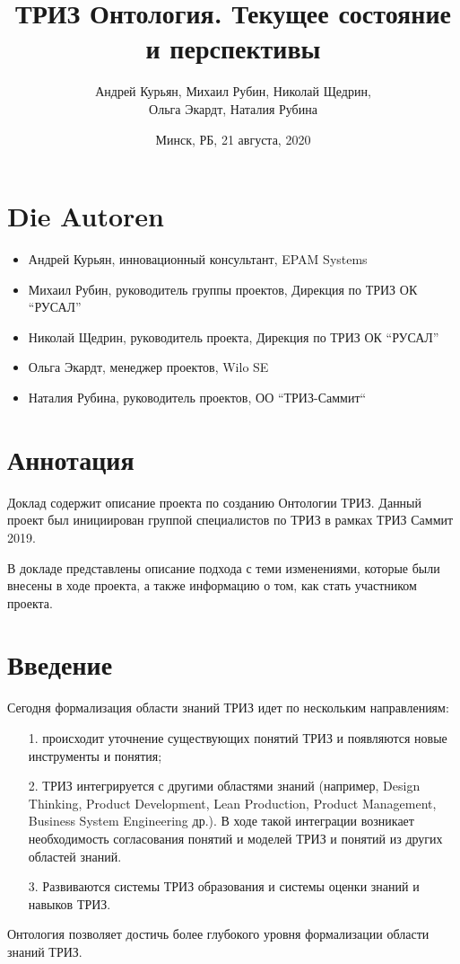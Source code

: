 \documentclass[11pt,a4paper]{article}
\title{ТРИЗ Онтология. Текущее состояние и перспективы}
\author{Андрей Курьян, Михаил Рубин, Николай Щедрин,\\ Ольга Экардт, Наталия
  Рубина}
\date{Минск, РБ, 21 августа, 2020}
\begin{document}
\maketitle

\section{Die Autoren}

\begin{itemize}[noitemsep]
\item Андрей Курьян, инновационный консультант, EPAM Systems
\item Михаил Рубин, руководитель группы проектов, Дирекция по ТРИЗ ОК “РУСАЛ”
\item Николай Щедрин, руководитель проекта, Дирекция по ТРИЗ ОК “РУСАЛ”
\item Ольга Экардт, менеджер проектов, Wilo SE
\item Наталия Рубина, руководитель проектов, ОО “ТРИЗ-Саммит“
\end{itemize}

\section{Аннотация}

Доклад содержит описание проекта по созданию Онтологии ТРИЗ. Данный проект был
инициирован группой специалистов по ТРИЗ в рамках ТРИЗ Саммит 2019.

В докладе представлены описание подхода с теми изменениями, которые были
внесены в ходе проекта, а также информацию о том, как стать участником
проекта.

\section{Введение}

Сегодня формализация области знаний ТРИЗ идет по нескольким направлениям:
\begin{itemize}
\item[1.] происходит уточнение существующих понятий ТРИЗ и появляются новые
  инструменты и понятия;
\item[2.] ТРИЗ интегрируется с другими областями знаний (например, Design
  Thinking, Product Development, Lean Production, Product Management, Business
  System Engi\-neering др.). В ходе такой интеграции возникает необходимость
  согласования понятий и моделей ТРИЗ и понятий из других областей знаний.
\item[3.] Развиваются системы ТРИЗ образования и системы оценки знаний и
  навыков ТРИЗ. 
\end{itemize}
Онтология позволяет достичь более глубокого уровня формализации области знаний
ТРИЗ.
\end{document}
